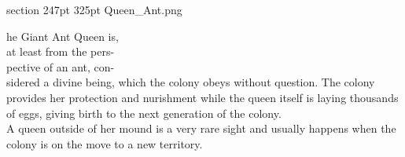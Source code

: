 \def\primarycolor{titlered}%
\def\secondarycolor{white}%
\MonsterBannerGraphic%
	{}%
	{section}%
	{247pt}%
	{325pt}%
	{Queen_Ant.png}%
	{}%
%
\vspace{13pt}
\entryfont \noindent {}he Giant Ant Queen is,\\
at least from the pers-\\
pective of an ant, con-\\
sidered a divine being, which the colony obeys without question. The colony provides her protection and nurishment while the queen itself is laying thousands of eggs, giving birth to the next generation of the colony.\\
A queen outside of her mound is a very rare sight and usually happens when the colony is on the move to a new territory.


